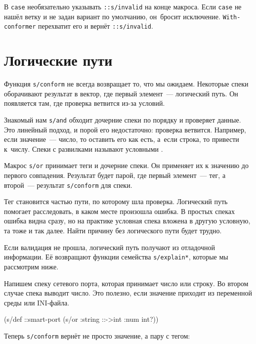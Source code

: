 \fi

\mnoindent
В \verb|case| необязательно указывать \verb|::s/invalid| на конце
макроса. Если \verb|case| не нашёл ветку и не задан вариант по умолчанию,
он~бросит исключение. \verb|With-conformer| перехватит его и вернёт
\verb|::s/invalid|.

\section{Логические пути}


Функция \verb|s/conform| не всегда возвращает то, что мы ожидаем. Некоторые
спеки оборачивают результат в вектор, где первый элемент~--- логический путь. Он
появляется там, где проверка ветвится из-за условий.

Знакомый нам \verb|s/and| обходит дочерние спеки по порядку и проверяет
данные. Это линейный подход, и порой его недостаточно: проверка
ветвится. Например, если значение~--- число, то оставить его как есть, а~если
строка, то привести к~числу. Спеки с развилками называют условными
.

Макрос \verb|s/or| принимает теги и дочерние спеки. Он применяет их к значению
до первого совпадения. Результат будет парой, где первый элемент~--- тег, а
второй~--- результат \verb|s/conform| для спеки.

Тег становится частью пути, по которому шла проверка. Логический путь помогает
расследовать, в каком месте произошла ошибка. В простых спеках ошибка видна
сразу, но на практике условная спека вложена в другую условную, та тоже и так
далее. Найти причину без логического пути будет трудно.


Если валидация не прошла, логический путь получают из отладочной информации. Её
возвращают функции семейства \verb|s/explain*|, которые мы рассмотрим ниже.

Напишем спеку сетевого порта, которая принимает число или строку. Во втором
случае спека выводит число. Это полезно, если значение приходит из переменной
среды или INI-файла.

\begin{english}
  \begin{clojure}
(s/def ::smart-port
  (s/or :string ::->int :num int?))
  \end{clojure}
\end{english}

\noindent
Теперь \verb|s/conform| вернёт не просто значение, а пару с тегом:

